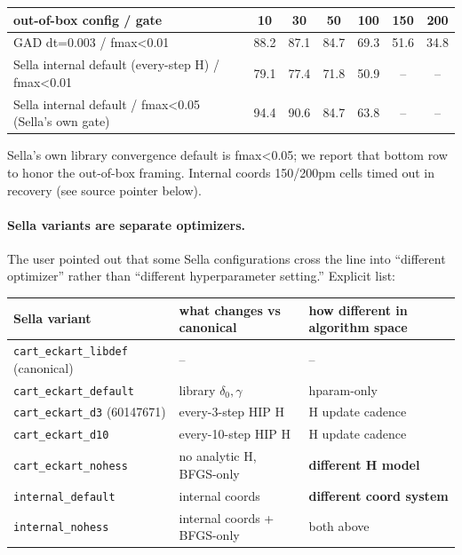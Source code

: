 \documentclass[11pt]{article}
\begin{document}
\begin{center}\small
\begin{tabular}{l|cccccc}
\toprule
out-of-box config / gate                                  & 10 & 30 & 50 & 100 & 150 & 200 \\
\midrule
GAD dt=0.003 / fmax<0.01                                  & 88.2 & 87.1 & 84.7 & 69.3 & 51.6 & 34.8 \\
Sella internal default (every-step H) / fmax<0.01         & 79.1 & 77.4 & 71.8 & 50.9 & --   & --   \\
Sella internal default / fmax<0.05 (Sella's own gate)     & 94.4 & 90.6 & 84.7 & 63.8 & --   & --   \\
\bottomrule
\end{tabular}
\end{center}
{\small Sella's own library convergence default is fmax<0.05; we report
that bottom row to honor the out-of-box framing. Internal coords 150/200pm
cells timed out in recovery (see source pointer below).}

\paragraph{Sella variants are separate optimizers.} The user pointed out
that some Sella configurations cross the line into ``different optimizer''
rather than ``different hyperparameter setting.'' Explicit list:

\begin{center}\small
\begin{tabular}{l|p{4.5cm}|p{4.0cm}}
\toprule
Sella variant & what changes vs canonical & how different in algorithm space \\
\midrule
\texttt{cart\_eckart\_libdef} (canonical)   & --                                       & -- \\
\texttt{cart\_eckart\_default}              & library $\delta_0,\gamma$                & hparam-only \\
\texttt{cart\_eckart\_d3} (60147671)        & every-3-step HIP H                       & H update cadence \\
\texttt{cart\_eckart\_d10}                  & every-10-step HIP H                      & H update cadence \\
\texttt{cart\_eckart\_nohess}               & no analytic H, BFGS-only                 & \textbf{different H model} \\
\texttt{internal\_default}                  & internal coords                          & \textbf{different coord system} \\
\texttt{internal\_nohess}                   & internal coords + BFGS-only              & both above \\
\bottomrule
\end{tabular}
\end{center}
\end{document}
